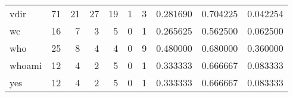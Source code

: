 \begin{tabular}{lrrrrrrrrr}
vdir      &                                      71 &                                                 21 &                                                 27 &                                                 19 &                                                  1 &                                                  3 &                                           0.281690 &                               0.704225 &                             0.042254 \\
wc        &                                      16 &                                                  7 &                                                  3 &                                                  5 &                                                  0 &                                                  1 &                                           0.265625 &                               0.562500 &                             0.062500 \\
who       &                                      25 &                                                  8 &                                                  4 &                                                  4 &                                                  0 &                                                  9 &                                           0.480000 &                               0.680000 &                             0.360000 \\
whoami    &                                      12 &                                                  4 &                                                  2 &                                                  5 &                                                  0 &                                                  1 &                                           0.333333 &                               0.666667 &                             0.083333 \\
yes       &                                      12 &                                                  4 &                                                  2 &                                                  5 &                                                  0 &                                                  1 &                                           0.333333 &                               0.666667 &                             0.083333 \\
\bottomrule
\end{tabular}
